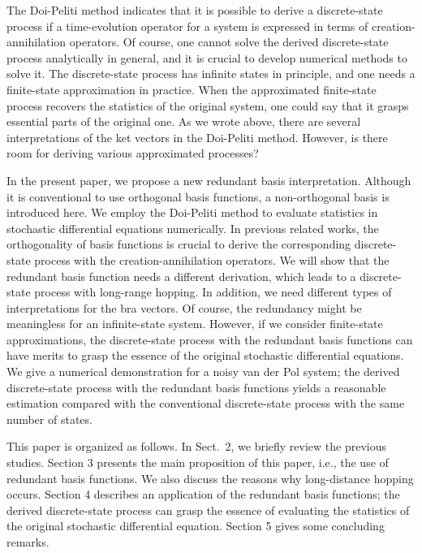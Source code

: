 \documentclass[sn-mathphys,Numbered]{sn-jnl}%
\theoremstyle{thmstyleone}%
\theoremstyle{thmstyletwo}%
\theoremstyle{thmstylethree}%
\begin{document}
The Doi-Peliti method indicates that it is possible to derive a discrete-state process if a time-evolution operator for a system is expressed in terms of creation-annihilation operators. Of course, one cannot solve the derived discrete-state process analytically in general, and it is crucial to develop numerical methods to solve it. The discrete-state process has infinite states in principle, and one needs a finite-state approximation in practice. When the approximated finite-state process recovers the statistics of the original system, one could say that it grasps essential parts of the original one. As we wrote above, there are several interpretations of the ket vectors in the Doi-Peliti method. However, is there room for deriving various approximated processes? 


In the present paper, we propose a new redundant basis interpretation. Although it is conventional to use orthogonal basis functions, a non-orthogonal basis is introduced here. We employ the Doi-Peliti method to evaluate statistics in stochastic differential equations numerically. In previous related works, the orthogonality of basis functions is crucial to derive the corresponding discrete-state process with the creation-annihilation operators. We will show that the redundant basis function needs a different derivation, which leads to a discrete-state process with long-range hopping. In addition, we need different types of interpretations for the bra vectors. Of course, the redundancy might be meaningless for an infinite-state system. However, if we consider finite-state approximations, the discrete-state process with the redundant basis functions can have merits to grasp the essence of the original stochastic differential equations. We give a numerical demonstration for a noisy van der Pol system; the derived discrete-state process with the redundant basis functions yields a reasonable estimation compared with the conventional discrete-state process with the same number of states.


This paper is organized as follows. In Sect.~2, we briefly review the previous studies. Section 3 presents the main proposition of this paper, i.e., the use of redundant basis functions. We also discuss the reasons why long-distance hopping occurs. Section 4 describes an application of the redundant basis functions; the derived discrete-state process can grasp the essence of evaluating the statistics of the original stochastic differential equation. Section 5 gives some concluding remarks.
\end{document}
